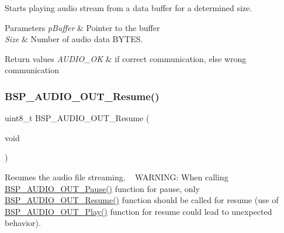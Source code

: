 Starts playing audio stream from a data buffer for a determined size. 


\begin{DoxyParams}{Parameters}
{\em p\+Buffer} & Pointer to the buffer \\
\hline
{\em Size} & Number of audio data B\+Y\+T\+ES. \\
\hline
\end{DoxyParams}

\begin{DoxyRetVals}{Return values}
{\em A\+U\+D\+I\+O\+\_\+\+OK} & if correct communication, else wrong communication \\
\hline
\end{DoxyRetVals}
\mbox{\label{group___s_t_m32_f4___d_i_s_c_o_v_e_r_y___a_u_d_i_o___o_u_t___exported___functions_ga064f0eddd4ab25a33fd1fe83af429c9f}} 
\subsubsection{\texorpdfstring{B\+S\+P\+\_\+\+A\+U\+D\+I\+O\+\_\+\+O\+U\+T\+\_\+\+Resume()}{BSP\_AUDIO\_OUT\_Resume()}}
{\footnotesize\ttfamily uint8\+\_\+t B\+S\+P\+\_\+\+A\+U\+D\+I\+O\+\_\+\+O\+U\+T\+\_\+\+Resume (\begin{DoxyParamCaption}\item[{void}]{ }\end{DoxyParamCaption})}



Resumes the audio file streaming. ~\newline
W\+A\+R\+N\+I\+NG\+: When calling \mbox{\hyperlink{group___s_t_m32_f4___d_i_s_c_o_v_e_r_y___a_u_d_i_o___o_u_t___private___functions_ga73a0f92b8adbfb2e8207067434c2bfef}{B\+S\+P\+\_\+\+A\+U\+D\+I\+O\+\_\+\+O\+U\+T\+\_\+\+Pause()}} function for pause, only \mbox{\hyperlink{group___s_t_m32_f4___d_i_s_c_o_v_e_r_y___a_u_d_i_o___o_u_t___private___functions_ga064f0eddd4ab25a33fd1fe83af429c9f}{B\+S\+P\+\_\+\+A\+U\+D\+I\+O\+\_\+\+O\+U\+T\+\_\+\+Resume()}} function should be called for resume (use of \mbox{\hyperlink{group___s_t_m32_f4___d_i_s_c_o_v_e_r_y___a_u_d_i_o___o_u_t___private___functions_gaa415fdd481a01468fdfcd9d91f0f6711}{B\+S\+P\+\_\+\+A\+U\+D\+I\+O\+\_\+\+O\+U\+T\+\_\+\+Play()}} function for resume could lead to unexpected behavior). 


